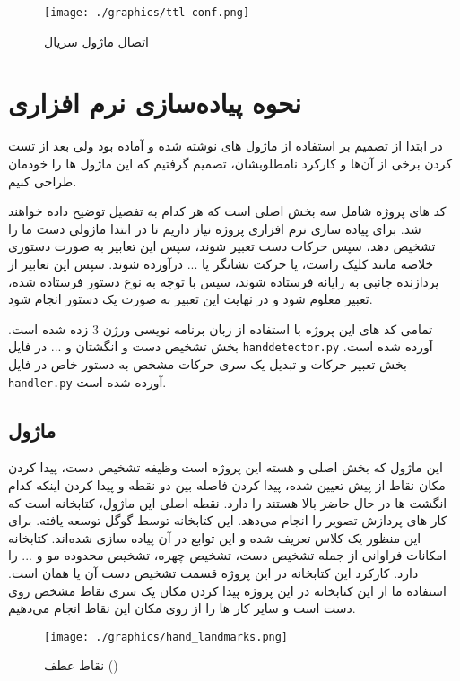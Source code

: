 \documentclass{article}
\begin{document}
\begin{figure}
	\centering
	\texttt{[image: ./graphics/ttl-conf.png]}
	\caption{اتصال ماژول سریال}
	\label{ttl-conf}
\end{figure}

\section{نحوه پیاده‌سازی نرم افزاری}
در ابتدا از تصمیم بر استفاده از ماژول های نوشته شده و آماده بود ولی بعد از تست کردن برخی از آن‌ها و کارکرد نامطلوبشان، تصمیم گرفتیم که این ماژول ها را خودمان طراحی کنیم.
 
کد های پروژه شامل سه بخش اصلی است که هر کدام به تفصیل توضیح داده خواهند شد. برای پیاده سازی نرم افزاری پروژه نیاز داریم تا در ابتدا ماژولی دست ما را تشخیص دهد، سپس حرکات دست تعبیر شوند، سپس این تعابیر به صورت دستوری خلاصه مانند کلیک راست، یا حرکت نشانگر یا ... درآورده شوند. سپس این تعابیر از پردازنده جانبی به رایانه فرستاده شوند، سپس با توجه به نوع دستور فرستاده شده، تعبیر   معلوم شود و در نهایت این تعبیر به صورت یک دستور  انجام شود.

تمامی کد های این پروژه با استفاده از زبان برنامه نویسی  ورژن 3 زده شده است. بخش تشخیص دست و انگشتان و ... در فایل
\verb~handdetector.py~
 آورده شده است. بخش تعبیر حرکات و تبدیل یک سری حرکات مشخص به دستور خاص در فایل 
 \verb~handler.py~
  آورده شده است.

\subsection{ماژول }
این ماژول که بخش اصلی و هسته این پروژه است وظیفه تشخیص دست، پیدا کردن مکان نقاط از پیش تعیین شده، پیدا کردن فاصله بین دو نقطه و پیدا کردن اینکه کدام انگشت ها در حال حاضر بالا هستند را دارد.
نقطه اصلی این ماژول، کتابخانه   است که کار های پردازش تصویر را انجام می‌دهد. این کتابخانه توسط گوگل توسعه یافته. برای این منظور یک کلاس  تعریف شده و این توابع در آن پیاده سازی شده‌اند.
کتابخانه  امکانات فراوانی از جمله تشخیص دست، تشخیص چهره، تشخیص محدوده مو و ... را دارد. کارکرد این کتابخانه در این پروژه قسمت تشخیص دست آن یا همان  است. استفاده ما از این کتابخانه در این پروژه پیدا کردن مکان یک سری نقاط مشخص روی دست است و سایر کار ها را از روی مکان این نقاط انجام می‌دهیم.

\begin{figure}
	\centering
	\texttt{[image: ./graphics/hand\_landmarks.png]}
	\caption{نقاط عطف ()}
	\label{landmark}
\end{figure}
\end{document}
